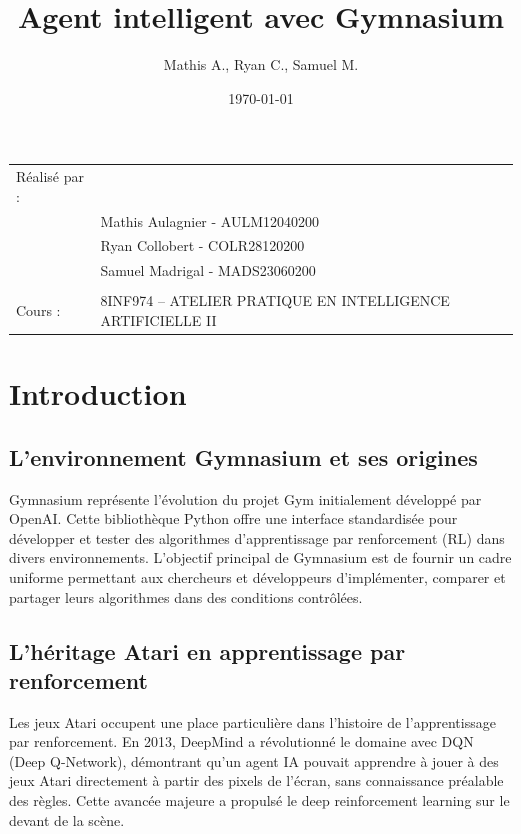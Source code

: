 \documentclass{article}
\title{Agent intelligent avec Gymnasium}
\author{Mathis A., Ryan C., Samuel M.}
\date{\today}
\begin{document}
\maketitle
\noindent\begin{tabular}{@{}ll}
    Réalisé par :\\
        & Mathis Aulagnier - AULM12040200 \\
        & Ryan Collobert - COLR28120200 \\
        & Samuel Madrigal - MADS23060200 \\
        \\
    Cours :  &  8INF974 – ATELIER PRATIQUE EN INTELLIGENCE ARTIFICIELLE II \\
\end{tabular}

\clearpage

\section{Introduction}

\subsection{L'environnement Gymnasium et ses origines}

\quad Gymnasium représente l'évolution du projet Gym initialement développé par OpenAI. Cette bibliothèque Python offre une interface standardisée pour développer et tester des algorithmes d'apprentissage par renforcement (RL) dans divers environnements. L'objectif principal de Gymnasium est de fournir un cadre uniforme permettant aux chercheurs et développeurs d'implémenter, comparer et partager leurs algorithmes dans des conditions contrôlées.

\subsection{L'héritage Atari en apprentissage par renforcement}

\quad Les jeux Atari occupent une place particulière dans l'histoire de l'apprentissage par renforcement. En 2013, DeepMind a révolutionné le domaine avec DQN (Deep Q-Network), démontrant qu'un agent IA pouvait apprendre à jouer à des jeux Atari directement à partir des pixels de l'écran, sans connaissance préalable des règles. Cette avancée majeure a propulsé le deep reinforcement learning sur le devant de la scène.\\
\end{document}
